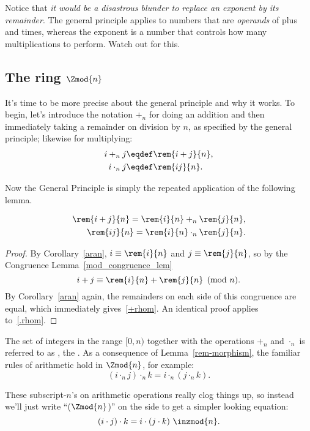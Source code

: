 Notice that \emph{it would be a disastrous blunder to replace an
  exponent by its remainder}.  The general principle applies to
numbers that are \emph{operands} of plus and times, whereas the
exponent is a number that controls how many multiplications to
perform.  Watch out for this.

\subsection{The ring $\Zmod{n}$}\label{subsec:ringZn}

It's time to be more precise about the general principle and why it
works.  To begin, let's introduce the notation $+_n$ for doing an
addition and then immediately taking a remainder on division by $n$,
as specified by the general principle; likewise for multiplying:
\begin{align*}
i +_n j & \eqdef \rem{i+j}{n},\\
i \cdot_n j & \eqdef \rem{ij}{n}.
\end{align*}

Now the General Principle is simply the repeated application of the
following lemma.
\begin{lemma}\label{rem-morphism}
\begin{align}
\rem{i+j}{n} = \rem{i}{n} +_n \rem{j}{n},\label{+rhom}\\
\rem{ij}{n} = \rem{i}{n} \cdot_n \rem{j}{n}.\label{.rhom}
\end{align}
\end{lemma}

\begin{proof}
By Corollary~\ref{aran}, $i \equiv \rem{i}{n}$ and $j \equiv
\rem{j}{n}$, so by the Congruence Lemma~\ref{mod_congruence_lem}
\[
i + j \equiv \rem{i}{n} + \rem{j}{n} \pmod{n}.
\]
By Corollary~\ref{aran} again, the remainders on each side of this
congruence are equal, which immediately gives~\eqref{+rhom}.  An
identical proof applies to~\eqref{.rhom}.
\end{proof}

The set of integers in the range $[0,n)$ together with the operations
  $+_n$ and $\cdot_n$ is referred to as , the
  .  As a consequence of
  Lemma~\ref{rem-morphism}, the familiar rules of arithmetic hold in
  $\Zmod{n}$, for example:
\[
(i \cdot_n j) \cdot_n k = i \cdot_n (j \cdot_n k).
\]

These subscript-$n$'s on arithmetic operations really clog things up,
so instead we'll just write ``($\Zmod{n}$)'' on the side to get a
simpler looking equation:
\[
(i \cdot j) \cdot k = i \cdot (j \cdot k) \ \inzmod{n}.
\]

